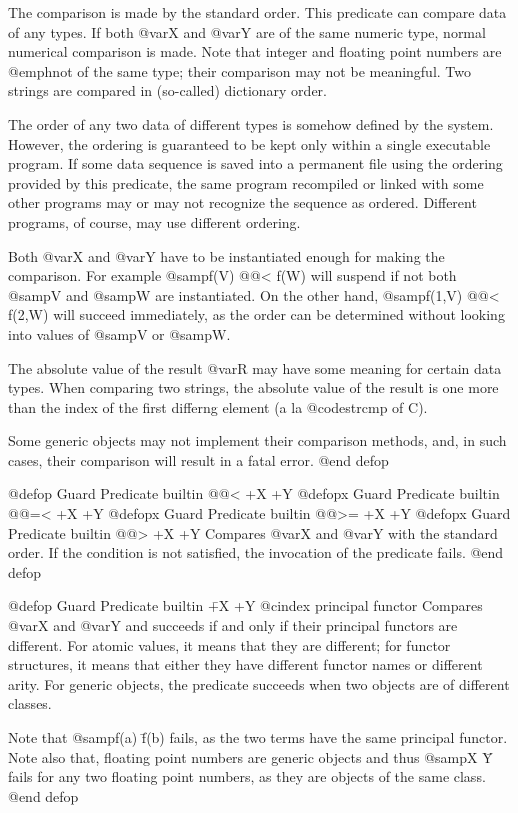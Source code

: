 {The comparison is made by the standard order.  This predicate can
compare data of any types.  If both @var{X} and @var{Y} are of the same
numeric type, normal numerical comparison is made.  Note that integer
and floating point numbers are @emph{not} of the same type; their
comparison may not be meaningful.  Two strings are compared in
(so-called) dictionary order.

The order of any two data of different types is somehow defined by the
system.  However, the ordering is guaranteed to be kept only within a
single executable program.  If some data sequence is saved into a
permanent file using the ordering provided by this predicate, the same
program recompiled or linked with some other programs may or may not
recognize the sequence as ordered.  Different programs, of course, may
use different ordering.

Both @var{X} and @var{Y} have to be instantiated enough for making the
comparison.  For example @samp{f(V) @@< f(W)} will suspend if not both
@samp{V} and @samp{W} are instantiated.  On the other hand, @samp{f(1,V)
@@< f(2,W)} will succeed immediately, as the order can be determined
without looking into values of @samp{V} or @samp{W}.

The absolute value of the result @var{R} may have some meaning for
certain data types.  When comparing two strings, the absolute value of
the result is one more than the index of the first differng element (a
la @code{strcmp} of C).

Some generic objects may not implement their comparison methods, and, in
such cases, their comparison will result in a fatal error.
@end defop

@defop {Guard Predicate} {builtin} @@< +X +Y
@defopx {Guard Predicate} {builtin} @@=< +X +Y
@defopx {Guard Predicate} {builtin} @@>= +X +Y
@defopx {Guard Predicate} {builtin} @@> +X +Y
Compares @var{X} and @var{Y} with the standard order.  If the condition
is not satisfied, the invocation of the predicate fails.
@end defop

@defop {Guard Predicate} {builtin} \= +X +Y
@cindex principal functor
Compares @var{X} and @var{Y} and succeeds if and only if their principal
functors are different.  For atomic values, it means that they are
different; for functor structures, it means that either they have
different functor names or different arity.  For generic objects, the
predicate succeeds when two objects are of different classes.

Note that @samp{f(a) \= f(b)} fails, as the two terms have the same
principal functor.  Note also that, floating point numbers are generic
objects and thus @samp{X \= Y} fails for any two floating point numbers,
as they are objects of the same class.
@end defop

}
